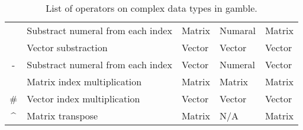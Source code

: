 \begin{table}[ht]
\begin{tabular}{|c|l|l|l|l|}
                    & Substract numeral from each index         & Matrix                           & Numaral                           & Matrix                          \\ \cline{2-5}
                    & \cellcolor{gray!40}Vector substraction    & \cellcolor{gray!40}Vector        & \cellcolor{gray!40}Vector         & \cellcolor{gray!40}Vector       \\ \cline{2-5} 
\multirow{-4}{*}{-} & Substract numeral from each index         & Vector                           & Numeral                           & Vector                          \\ \hline
                    & \cellcolor{gray!40}Matrix index multiplication & \cellcolor{gray!40}Matrix & \cellcolor{gray!40}Matrix & \cellcolor{gray!40}Matrix \\ \cline{2-5}
\multirow{-2}{*}{\#} & Vector index multiplication & Vector & Vector & Vector \\ \hline
\^{}                 & \cellcolor{gray!40}Matrix transpose & \cellcolor{gray!40}Matrix & \cellcolor{gray!40}N/A & \cellcolor{gray!40}Matrix \\ \hline  

\end{tabular}
\caption{List of operators on complex data types in \gls{gamble}. }\label{tbl:matOps}
\end{table}